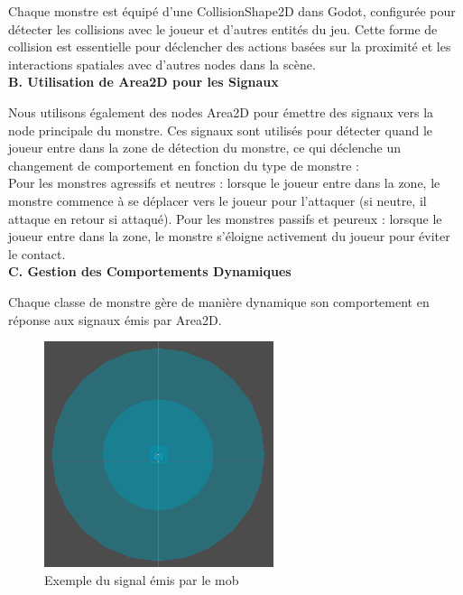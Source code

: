 Chaque monstre est équipé d'une CollisionShape2D dans Godot, configurée pour détecter les collisions avec le joueur et d'autres entités du jeu.
Cette forme de collision est essentielle pour déclencher des actions basées sur la proximité et les interactions spatiales avec d'autres nodes dans la scène.
\\

\textbf{B. Utilisation de Area2D pour les Signaux}
\vspace*{0.2cm}

Nous utilisons également des nodes Area2D pour émettre des signaux vers la node principale du monstre.
Ces signaux sont utilisés pour détecter quand le joueur entre dans la zone de détection du monstre, ce qui déclenche un changement de comportement en fonction du type de monstre :
\\

Pour les monstres agressifs et neutres : lorsque le joueur entre dans la zone, le monstre commence à se déplacer vers le joueur pour l'attaquer (si neutre, il attaque en retour si attaqué).
Pour les monstres passifs et peureux : lorsque le joueur entre dans la zone, le monstre s'éloigne activement du joueur pour éviter le contact.
\\

\textbf{C. Gestion des Comportements Dynamiques}
\vspace*{0.2cm}

Chaque classe de monstre gère de manière dynamique son comportement en réponse aux signaux émis par Area2D.

\begin{figure}[H]
      \centering
      \includegraphics[width=0.6\textwidth]{assets/mob.png}
      \caption{Exemple du signal émis par le mob}
      \label{fig:website1}
\end{figure}

